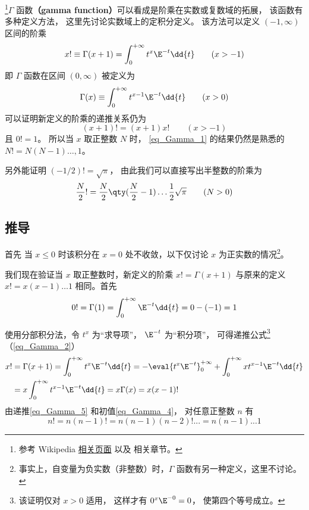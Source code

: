 

\footnote{参考 Wikipedia \href{https://en.wikipedia.org/wiki/Gamma_function}{相关页面} 以及 \cite{Arfken} 相关章节。}$\Gamma$ 函数\textbf{（gamma function）}可以看成是阶乘在实数或复数域的拓展， 该函数有多种定义方法， 这里先讨论实数域上的定积分定义。 该方法可以定义 $(-1, \infty)$ 区间的阶乘
\begin{equation}\label{eq_Gamma_1}
x! \equiv \Gamma (x + 1) = \int_0^{+\infty} t^x \E^{-t} \dd{t} \qquad (x > -1)
\end{equation}
即 $\Gamma$ 函数在区间 $(0,\infty)$ 被定义为
\begin{equation}\label{eq_Gamma_3}
\Gamma(x) \equiv \int_0^{+\infty} t^{x-1} \E^{-t} \dd{t} \qquad (x > 0)
\end{equation}
可以证明新定义的阶乘的递推关系仍为
\begin{equation}\label{eq_Gamma_2}
(x+1)!=(x+1)x! \qquad (x>-1)
\end{equation}
且 $0! = 1$。 所以当 $x$ 取正整数 $N$ 时， \autoref{eq_Gamma_1} 的结果仍然是熟悉的 $N! = N(N-1)\dots, 1$。

另外能证明 $(-1/2)!=\sqrt{\pi}$， 由此我们可以直接写出半整数的阶乘为
\begin{equation}
\frac{N}{2}! = \frac{N}{2} \qty(\frac{N}{2}-1) \dots \frac12 \sqrt{\pi} \qquad (N > 0)
\end{equation}

\subsection{推导}

首先
当 $x \leqslant 0$ 时该积分在 $x=0$ 处不收敛，以下仅讨论 $x$ 为正实数的情况\footnote{事实上，自变量为负实数（非整数）时，$\Gamma$ 函数有另一种定义，这里不讨论。}。

我们现在验证当 $x$ 取正整数时，新定义的阶乘 $x! = \Gamma(x+1)$ 与原来的定义 $x! = x(x-1)\dots 1$ 相同。首先
\begin{equation}\label{eq_Gamma_4}
0! = \Gamma(1) = \int_0^{+\infty} \E^{-t} \dd{t} = 0 - (-1) = 1
\end{equation}

使用分部积分法，令 $t^x$ 为“求导项”， $\E^{-t}$ 为“积分项”， 可得递推公式\footnote{该证明仅对 $x>0$ 适用， 这样才有 $0^x \E^{-0} = 0$， 使第四个等号成立。}（\autoref{eq_Gamma_2}）
\begin{equation}\label{eq_Gamma_5}
\begin{aligned}
x! &= \Gamma(x+1) = \int_0^{+\infty} t^x \E^{-t} \dd{t} =  - \eval{t^x \E^{-t}}_{0}^{+\infty} + \int_0^{+\infty} x t^{x-1} \E^{-t} \dd{t} \\
&= x\int_0^{+\infty} t^{x-1} \E^{-t} \dd{t} = x\Gamma (x) = x(x-1)!
\end{aligned} \end{equation} 
由递推\autoref{eq_Gamma_5} 和初值\autoref{eq_Gamma_4}， 对任意正整数 $n$ 有
\begin{equation}
n! = n(n-1)! = n(n-1)(n-2)!... = n(n-1)...1
\end{equation}

